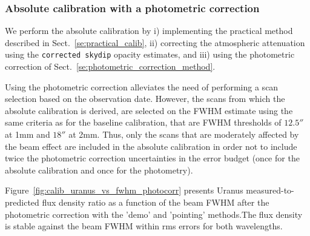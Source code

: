 \subsubsection{Absolute calibration with a photometric correction}

We perform the absolute calibration by i) implementing the practical
method described in Sect.~\ref{se:practical_calib}, ii) correcting the
atmospheric attenuation using the {\tt corrected skydip} opacity
estimates, and iii) using the photometric correction of
Sect.~\ref{se:photometric_correction_method}.

Using the photometric correction alleviates the need of
performing a scan selection based on the observation date. However,
the scans from which the absolute calibration is derived, are selected
on the FWHM estimate using the same criteria as for the baseline
calibration, that are FWHM thresholds of $12.5''$ at 1mm and $18''$ at
2mm.  Thus, only the scans that are moderately affected by the beam
effect are included in the absolute calibration in order not to
include twice the photometric correction uncertainties in the error
budget (once for the absolute calibration and once for the photometry).

Figure~\ref{fig:calib_uranus_vs_fwhm_photocorr} presents Uranus
measured-to-predicted flux density ratio as a function of the beam FWHM
after the photometric correction with the 'demo' and 'pointing'
methods.The flux density is stable against the beam FWHM within rms
errors for both wavelengths. 

